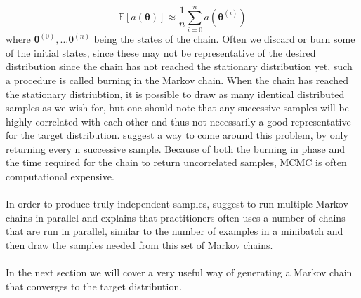 \begin{equation*}
    \mathbb{E}\left[a(\boldsymbol{\theta})\right]\approx \frac{1}{n}\sum_{i=0}^n a(\boldsymbol{\theta}^{(i)})
\end{equation*}
where $\boldsymbol{\theta}^{(0)},\ldots \boldsymbol{\theta}^{(n)}$ being the states of the chain. Often we discard or burn some of the initial states, since these may not be representative of the desired distribution since the chain has not reached the stationary distribution yet, such a procedure is called burning in the Markov chain. When the chain has reached the stationary distriubtion, it is possible to draw as many identical distributed samples as we wish for, but one should note that any successive samples will be highly correlated with each other and thus not necessarily a good representative for the target distribution. \cite{Goodfellow-et-al-2016} suggest a way to come around this problem, by only returning every n successive sample. Because of both the burning in phase and the time required for the chain to return uncorrelated samples, MCMC is often computational expensive. \\
\\
In order to produce truly independent samples, \cite{Goodfellow-et-al-2016} suggest to run multiple Markov chains in parallel and explains that practitioners often uses a number of chains that are run in parallel, similar to the number of examples in a minibatch and then draw the samples needed from this set of Markov chains. \\
\\
In the next section we will cover a very useful way of generating a Markov chain that converges to the target distribution. 


